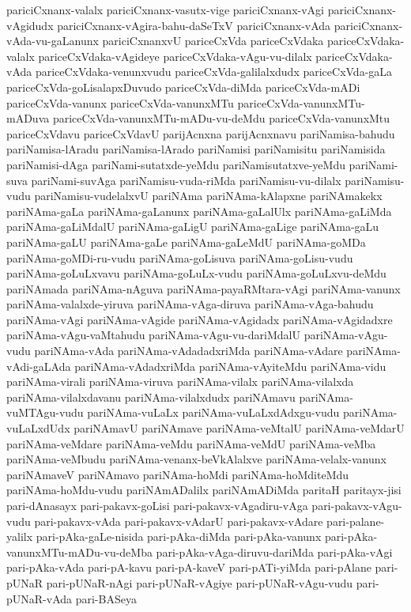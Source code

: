 {pariciCxnanx-valalx
pariciCxnanx-vasutx-vige
pariciCxnanx-vAgi
pariciCxnanx-vAgidudx
pariciCxnanx-vAgira-bahu-daSeTxV
pariciCxnanx-vAda
pariciCxnanx-vAda-vu-gaLanunx
pariciCxnanxvU
pariceCxVda
pariceCxVdaka
pariceCxVdaka-valalx
pariceCxVdaka-vAgideye
pariceCxVdaka-vAgu-vu-dilalx
pariceCxVdaka-vAda
pariceCxVdaka-venunxvudu
pariceCxVda-galilalxdudx
pariceCxVda-gaLa
pariceCxVda-goLisalapxDuvudo
pariceCxVda-diMda
pariceCxVda-mADi
pariceCxVda-vanunx
pariceCxVda-vanunxMTu
pariceCxVda-vanunxMTu-mADuva
pariceCxVda-vanunxMTu-mADu-vu-deMdu
pariceCxVda-vanunxMtu
pariceCxVdavu
pariceCxVdavU
parijAcnxna
parijAcnxnavu
pariNamisa-bahudu
pariNamisa-lAradu
pariNamisa-lArado
pariNamisi
pariNamisitu
pariNamisida
pariNamisi-dAga
pariNami-sutatxde-yeMdu
pariNamisutatxve-yeMdu
pariNami-suva
pariNami-suvAga
pariNamisu-vuda-riMda
pariNamisu-vu-dilalx
pariNamisu-vudu
pariNamisu-vudelalxvU
pariNAma
pariNAma-kAlapxne
pariNAmakekx
pariNAma-gaLa
pariNAma-gaLanunx
pariNAma-gaLalUlx
pariNAma-gaLiMda
pariNAma-gaLiMdalU
pariNAma-gaLigU
pariNAma-gaLige
pariNAma-gaLu
pariNAma-gaLU
pariNAma-gaLe
pariNAma-gaLeMdU
pariNAma-goMDa
pariNAma-goMDi-ru-vudu
pariNAma-goLisuva
pariNAma-goLisu-vudu
pariNAma-goLuLxvavu
pariNAma-goLuLx-vudu
pariNAma-goLuLxvu-deMdu
pariNAmada
pariNAma-nAguva
pariNAma-payaRMtara-vAgi
pariNAma-vanunx
pariNAma-valalxde-yiruva
pariNAma-vAga-diruva
pariNAma-vAga-bahudu
pariNAma-vAgi
pariNAma-vAgide
pariNAma-vAgidadx
pariNAma-vAgidadxre
pariNAma-vAgu-vaMtahudu
pariNAma-vAgu-vu-dariMdalU
pariNAma-vAgu-vudu
pariNAma-vAda
pariNAma-vAdadadxriMda
pariNAma-vAdare
pariNAma-vAdi-gaLAda
pariNAma-vAdadxriMda
pariNAma-vAyiteMdu
pariNAma-vidu
pariNAma-virali
pariNAma-viruva
pariNAma-vilalx
pariNAma-vilalxda
pariNAma-vilalxdavanu
pariNAma-vilalxdudx
pariNAmavu
pariNAma-vuMTAgu-vudu
pariNAma-vuLaLx
pariNAma-vuLaLxdAdxgu-vudu
pariNAma-vuLaLxdUdx
pariNAmavU
pariNAmave
pariNAma-veMtalU
pariNAma-veMdarU
pariNAma-veMdare
pariNAma-veMdu
pariNAma-veMdU
pariNAma-veMba
pariNAma-veMbudu
pariNAma-venanx-beVkAlalxve
pariNAma-velalx-vanunx
pariNAmaveV
pariNAmavo
pariNAma-hoMdi
pariNAma-hoMditeMdu
pariNAma-hoMdu-vudu
pariNAmADalilx
pariNAmADiMda
paritaH
paritayx-jisi
pari-dAnasayx
pari-pakavx-goLisi
pari-pakavx-vAgadiru-vAga
pari-pakavx-vAgu-vudu
pari-pakavx-vAda
pari-pakavx-vAdarU
pari-pakavx-vAdare
pari-palane-yalilx
pari-pAka-gaLe-nisida
pari-pAka-diMda
pari-pAka-vanunx
pari-pAka-vanunxMTu-mADu-vu-deMba
pari-pAka-vAga-diruvu-dariMda
pari-pAka-vAgi
pari-pAka-vAda
pari-pA-kavu
pari-pA-kaveV
pari-pATi-yiMda
pari-pAlane
pari-pUNaR
pari-pUNaR-nAgi
pari-pUNaR-vAgiye
pari-pUNaR-vAgu-vudu
pari-pUNaR-vAda
pari-BASeya
}
